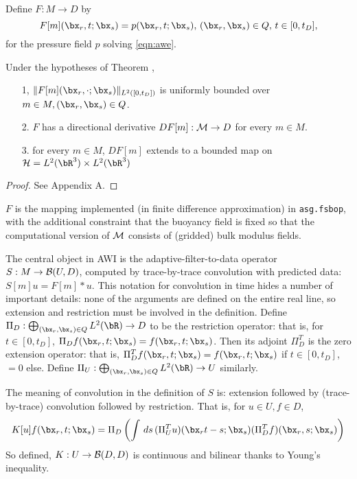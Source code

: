 Define $F: M \rightarrow D$ by
\[
  F[m](\bx_r,t;\bx_s) = p(\bx_r,t;\bx_s), \, (\bx_r,\bx_s) \in Q, \, t \in [0,t_D],
\]
for the pressure field $p$ solving \ref{eqn:awe}. 

\begin{theorem}
  \label{thm:mbd}
  Under the hypotheses of Theorem \label{thm:eu},
  \begin{itemize}
  \item [1, ] $\|F[m](\bx_r,\cdot;\bx_s)\|_{L^2([0,t_D])}$ is uniformly bounded over $m \in M, (\bx_r,\bx_s) \in Q$.
  \item [2. ] $F$ has a directional derivative $DF[m]: {\cal M} \rightarrow D$ for every $m \in M$.
    \item [3. ] for every $m \in M$, $DF[m]$ extends to a bounded map on ${\cal H} = L^2(\bR^3) \times L^2(\bR^3)$
  \end{itemize}
\end{theorem}
\begin{proof}
  See Appendix A.
\end{proof}

$F$ is the mapping implemented (in finite difference approximation) in {\tt asg.fsbop}, with the additional constraint that the buoyancy field is fixed so that the computational version of ${\cal M}$ consists of (gridded) bulk modulus fields. 

The central object in AWI is the adaptive-filter-to-data operator $S: M \rightarrow {\cal B}(U,D)$, computed by trace-by-trace convolution with predicted data: $S[m]u = F[m] * u$. This notation for convolution in time hides a number of important details: none of the arguments are defined on the entire real line, so extension and restriction must be involved in the definition. Define $\Pi_D: \bigoplus_{(\bx_r,\bx_s) \in Q} L^2(\bR) \rightarrow D$ to be the restriction operator: that is, for $t \in [0,t_D]$, $\Pi_Df(\bx_r,t;\bx_s) = f(\bx_r,t;\bx_s)$. Then its adjoint $\Pi_D^T$ is the zero extension operator: that is, $\Pi_D^Tf(\bx_r,t;\bx_s) = f(\bx_r,t;\bx_s)$ if $t \in [0,t_D]$, $= 0$ else. Define $\Pi_U:  \bigoplus_{(\bx_r,\bx_s) \in Q} L^2(\bR) \rightarrow U$ similarly.

The meaning of convolution in the definition of $S$ is: extension followed by (trace-by-trace) convolution followed by restriction. That is, for $u \in U, f \in D$,
\begin{equation}
  \label{eqn:convdef}
  K[u]f(\bx_r,t;\bx_s) = \Pi_D\left(\int\,ds\,(\Pi_U^Tu)(\bx_rt-s;\bx_s) (\Pi_D^Tf)(\bx_r,s;\bx_s)\right)
\end{equation}
So defined, $K:U \rightarrow {\cal B}(D,D)$ is continuous and bilinear thanks to Young's inequality.

